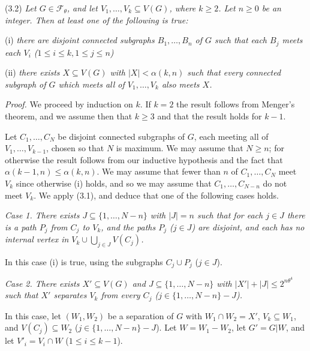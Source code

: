 \stmt
(3.2) \textit{Let $G \in \mathcal{F}_\theta$, and let $V_1, \dots, V_k \subseteq V(G)$, where $k \ge 2$. Let $n \ge 0$ be an integer. Then at least one of the following is true:}

\hspace*{12pt}(i) \textit{there are disjoint connected subgraphs $B_1, \dots, B_n$ of $G$ such that each $B_j$ meets each $V_i$ ($1 \le i \le k, 1 \le j \le n$)}

\hspace*{12pt}(ii) \textit{there exists $X \subseteq V(G)$ with $|X| < \alpha(k, n)$ such that every connected subgraph of $G$ which meets all of $V_1, \dots, V_k$ also meets $X$.}

\textit{Proof.} We proceed by induction on $k$. If $k = 2$ the result follows from Menger's theorem, and we assume then that $k \ge 3$ and that the result holds for $k - 1$.

Let $C_1, \dots, C_N$ be disjoint connected subgraphs of $G$, each meeting all of $V_1, \dots, V_{k-1}$, chosen so that $N$ is maximum. We may assume that $N \ge n$; for otherwise the result follows from our inductive hypothesis and the fact that $\alpha(k - 1, n) \le \alpha(k, n)$. We may assume that fewer than $n$ of $C_1, \dots, C_N$ meet $V_k$ since otherwise (i) holds, and so we may assume that $C_1, \dots, C_{N-n}$ do not meet $V_k$. We apply (3.1), and deduce that one of the following cases holds.

\textit{Case 1. There exists $J \subseteq \{1, \dots, N - n\}$ with $|J| = n$ such that for each $j \in J$ there is a path $P_j$ from $C_j$ to $V_k$, and the paths $P_j$ ($j \in J$) are disjoint, and each has no internal vertex in $V_k \cup \bigcup_{j \in J} V(C_j)$.}

In this case (i) is true, using the subgraphs $C_j \cup P_j$ ($j \in J$).

\textit{Case 2. There exists $X' \subseteq V(G)$ and $J \subseteq \{1, \dots, N - n\}$ with $|X'| + |J| \le 2^{n\theta^4}$ such that $X'$ separates $V_k$ from every $C_j$ ($j \in \{1, \dots, N - n\} - J$).}

In this case, let $(W_1, W_2)$ be a separation of $G$ with $W_1 \cap W_2 = X'$, $V_k \subseteq W_1$, and $V(C_j) \subseteq W_2$ ($j \in \{1, \dots, N - n\} - J$). Let $W = W_1 - W_2$, let $G' = G | W$, and let $V'_i = V_i \cap W$ ($1 \le i \le k - 1$).

